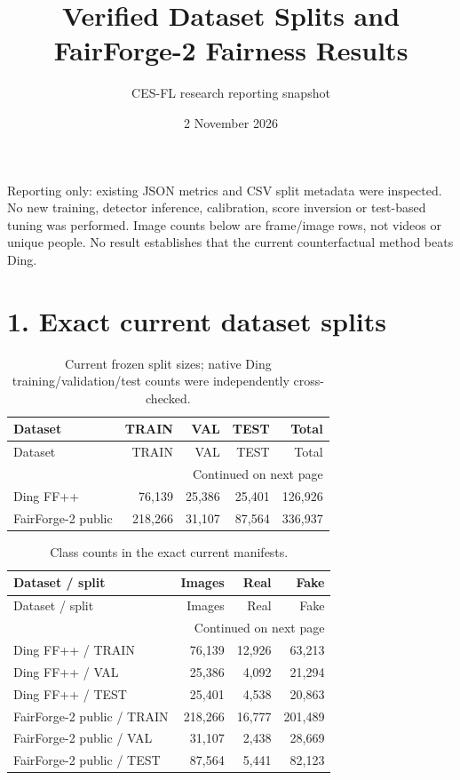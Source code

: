 \documentclass[10pt]{article}
\begin{document}
\raggedbottom
\title{Verified Dataset Splits and FairForge-2 Fairness Results}
\author{CES-FL research reporting snapshot}
\date{2 November 2026}
\maketitle
\small
Reporting only: existing JSON metrics and CSV split metadata were inspected. No new training, detector inference, calibration, score inversion or test-based tuning was performed. Image counts below are frame/image rows, not videos or unique people. No result establishes that the current counterfactual method beats Ding.

\section*{1. Exact current dataset splits}
\begin{longtable}{@{}lrrrr@{}}
\caption{Current frozen split sizes; native Ding training/validation/test counts were independently cross-checked.}\\
\toprule
Dataset & TRAIN & VAL & TEST & Total \\
\midrule
\endfirsthead
\toprule
Dataset & TRAIN & VAL & TEST & Total \\
\midrule
\endhead
\midrule
\multicolumn{5}{r}{Continued on next page}\\
\endfoot
\bottomrule
\endlastfoot
Ding FF++ & 76,139 & 25,386 & 25,401 & 126,926 \\
FairForge-2 public & 218,266 & 31,107 & 87,564 & 336,937 \\
\end{longtable}

\begin{longtable}{@{}lrrr@{}}
\caption{Class counts in the exact current manifests.}\\
\toprule
Dataset / split & Images & Real & Fake \\
\midrule
\endfirsthead
\toprule
Dataset / split & Images & Real & Fake \\
\midrule
\endhead
\midrule
\multicolumn{4}{r}{Continued on next page}\\
\endfoot
\bottomrule
\endlastfoot
Ding FF++ / TRAIN & 76,139 & 12,926 & 63,213 \\
Ding FF++ / VAL & 25,386 & 4,092 & 21,294 \\
Ding FF++ / TEST & 25,401 & 4,538 & 20,863 \\
FairForge-2 public / TRAIN & 218,266 & 16,777 & 201,489 \\
FairForge-2 public / VAL & 31,107 & 2,438 & 28,669 \\
FairForge-2 public / TEST & 87,564 & 5,441 & 82,123 \\
\end{longtable}
\end{document}
